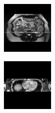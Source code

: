 \begin{figure}
\begin{subfigure}[b]{0.25\textwidth}
                \includegraphics[width=.95\linewidth]{img_hyperopt/Abdomen_1050}
        \end{subfigure}%
        \begin{subfigure}[b]{0.25\textwidth}
                \centering
                \includegraphics[width=.95\linewidth]{img_hyperopt/Abdomen_5115}

\end{subfigure}
\end{figure}
